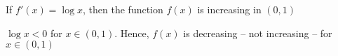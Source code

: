\documentclass[14pt,fleqn]{extarticle}
\begin{document}
 
\begin{snippet}
    
    \incorrect
    
    If $f'(x) = \log x$, then the function $f(x)$ is increasing in $(0,1)$ 
    
    \reason
    
    $\log x < 0$ for $x \in (0,1)$. Hence, $f(x)$ is decreasing -- not increasing -- for $x\in (0,1)$ 
    
\end{snippet} 
\end{document}
